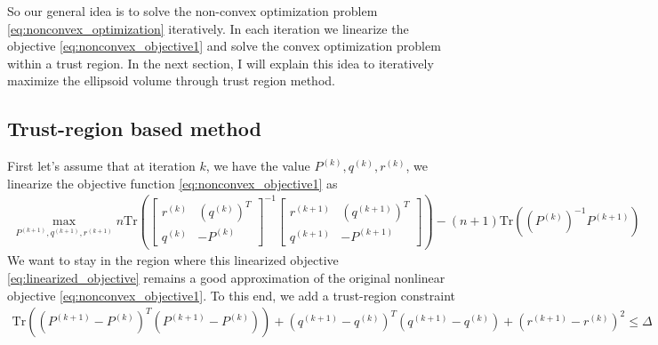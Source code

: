 \documentclass{article}
\begin{document}
So our general idea is to solve the non-convex optimization problem \eqref{eq:nonconvex_optimization} iteratively. In each iteration we linearize the objective \eqref{eq:nonconvex_objective1} and solve the convex optimization problem within a trust region. In the next section, I will explain this idea to iteratively maximize the ellipsoid volume through trust region method.

\subsection{Trust-region based method}
First let's assume that at iteration $k$, we have the value $P^{(k)}, q^{(k)}, r^{(k)}$, we linearize the objective function \eqref{eq:nonconvex_objective1} as
\begin{align}
	\max_{P^{(k+1)}, q^{(k+1)}, r^{(k+1)}} n\text{Tr}\left(\begin{bmatrix}r^{(k)} &(q^{(k)})^T\\q^{(k)} & -P^{(k)}\end{bmatrix}^{-1}\begin{bmatrix} r^{(k+1)} & (q^{(k+1)})^T\\q^{(k+1)} & -P^{(k+1)}\end{bmatrix}\right) - (n+1)\text{Tr}\left((P^{(k)})^{-1} P^{(k+1)}\right)
	\label{eq:linearized_objective}
\end{align}
We want to stay in the region where this linearized objective \eqref{eq:linearized_objective} remains a good approximation of the original nonlinear objective \eqref{eq:nonconvex_objective1}. To this end, we add a trust-region constraint
\begin{align}
	\text{Tr}((P^{(k+1)} - P^{(k)})^T(P^{(k+1)} - P^{(k)})) + (q^{(k+1)} - q^{(k)})^T(q^{(k+1)}-q^{(k)}) + (r^{(k+1)}-r^{(k)})^2\le\Delta
\end{align}



\end{document}
